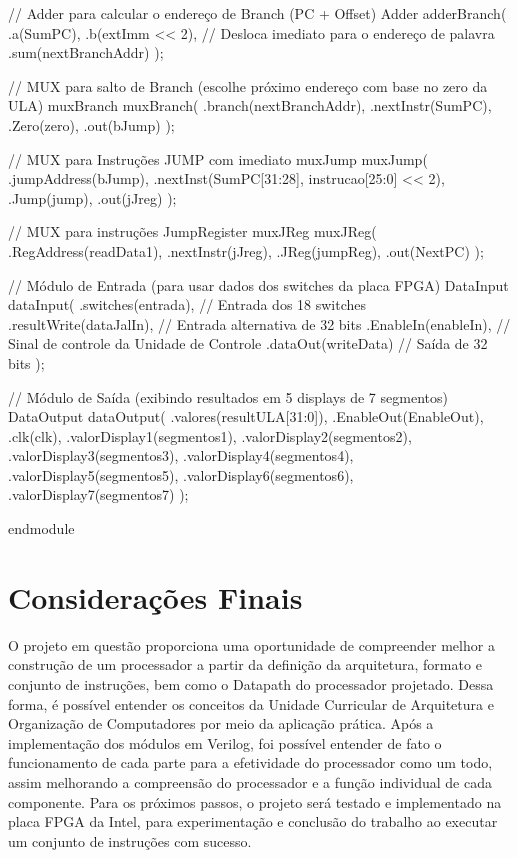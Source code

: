 \documentclass[
	12pt,				%
	openright,			%
	a4paper,			%
	english,			%
	french,				%
	spanish,			%
	brazil,				%
	]{abntex2}
\begin{document}
    // Adder para calcular o endereço de Branch (PC + Offset)
    Adder adderBranch(
        .a(SumPC),
        .b(extImm << 2),  // Desloca imediato para o endereço de palavra
        .sum(nextBranchAddr)
    );

    // MUX para salto de Branch (escolhe próximo endereço com base no zero da ULA)
    muxBranch muxBranch(
        .branch(nextBranchAddr),
        .nextInstr(SumPC),
        .Zero(zero),
        .out(bJump)  
    );
	 
	 // MUX para Instruções JUMP com imediato
	 muxJump muxJump(
		.jumpAddress(bJump),
		.nextInst({SumPC[31:28], instrucao[25:0] << 2}), 
		.Jump(jump),    
		.out(jJreg)
	 );
	 
	 // MUX para instruções JumpRegister
	 muxJReg muxJReg(
		.RegAddress(readData1),
		.nextInstr(jJreg),
		.JReg(jumpReg), 
		.out(NextPC)
	 );

    // Módulo de Entrada (para usar dados dos switches da placa FPGA)
    DataInput dataInput(
        .switches(entrada),      	// Entrada dos 18 switches
		  .resultWrite(dataJalIn),    // Entrada alternativa de 32 bits
		  .EnableIn(enableIn),      	// Sinal de controle da Unidade de Controle
		  .dataOut(writeData)        	// Saída de 32 bits
    );

    // Módulo de Saída (exibindo resultados em 5 displays de 7 segmentos)
    DataOutput dataOutput(
        .valores(resultULA[31:0]),
		  .EnableOut(EnableOut),
		  .clk(clk),
        .valorDisplay1(segmentos1),
		  .valorDisplay2(segmentos2),
		  .valorDisplay3(segmentos3),
		  .valorDisplay4(segmentos4),
		  .valorDisplay5(segmentos5), 
		  .valorDisplay6(segmentos6), 
		  .valorDisplay7(segmentos7)
    );

endmodule



\chapter{Considerações Finais}

O projeto em questão proporciona uma oportunidade de compreender melhor a construção de um processador a partir da definição da arquitetura, formato e conjunto de instruções, bem como o Datapath do processador projetado. Dessa forma, é possível entender os conceitos da Unidade Curricular de Arquitetura e Organização de Computadores por meio da aplicação prática.
Após a implementação dos módulos em Verilog, foi possível entender de fato o funcionamento de cada parte para a efetividade do processador como um todo, assim melhorando a compreensão do processador e a função individual de cada componente.
Para os próximos passos, o projeto será testado e implementado na placa FPGA da Intel, para experimentação e conclusão do trabalho ao executar um conjunto de instruções com sucesso.
\end{document}
